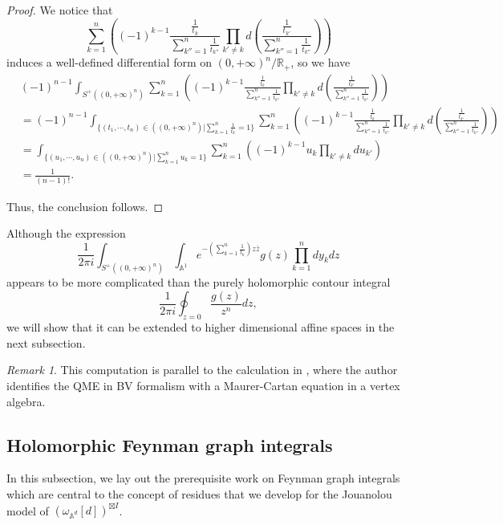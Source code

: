 \documentclass[11pt]{amsart}
\theoremstyle{definition}
\theoremstyle{remark}
\newtheorem{rem}[thm]{Remark}
\numberwithin{equation}{section}
\begin{document}
\begin{proof}
We notice that
$$
\sum_{k=1}^{n}\left((-1)^{k-1}\frac{\frac{1}{t_{k}}}{\sum_{k''=1}^{n}\frac{1}{t_{k''}}}\prod_{k'\neq k}d(\frac{\frac{1}{t_{k'}}}{\sum_{k''=1}^{n}\frac{1}{t_{k''}}})\right)
$$
induces a well-defined differential form on $(0,+\infty)^{n}/\mathbb{R}_+$, so we have
\begin{align*}
&(-1)^{n-1}\int_{S^{+}((0,+\infty)^n)}\sum_{k=1}^{n}\left((-1)^{k-1}\frac{\frac{1}{t_{k}}}{\sum_{k''=1}^{n}\frac{1}{t_{k''}}}\prod_{k'\neq k}d(\frac{\frac{1}{t_{k'}}}{\sum_{k''=1}^{n}\frac{1}{t_{k''}}})\right)\\
&=
(-1)^{n-1}\int_{\{(t_{1},\cdots,t_{n})\in((0,+\infty)^n)|\sum_{k=1}^{n}\frac{1}{t_{k}}=1\}}\sum_{k=1}^{n}\left((-1)^{k-1}\frac{\frac{1}{t_{k}}}{\sum_{k''=1}^{n}\frac{1}{t_{k''}}}\prod_{k'\neq k}d(\frac{\frac{1}{t_{k'}}}{\sum_{k''=1}^{n}\frac{1}{t_{k''}}})\right)\\
&=
\int_{\{(u_{1},\cdots,u_{n})\in((0,+\infty)^n)|\sum_{k=1}^{n}u_{k}=1\}}\sum_{k=1}^{n}\left((-1)^{k-1}u_{k}\prod_{k'\neq k}du_{k'}\right)\\
&=\frac{1}{(n-1)!}.
\end{align*}

Thus, the conclusion follows.
\end{proof}

Although the expression
$$
\frac{1}{2\pi i}\int_{S^{+}((0,+\infty)^n)}\int_{\mathbb{A}^{1}}e^{-\left(\sum_{k=1}^{n}\frac{1}{t_{k}}\right)z\bar{z}}g(z)\prod_{k=1}^{n}dy_{k}dz
$$
appears to be more complicated than the purely holomorphic contour integral
$$
\frac{1}{2\pi i}\oint_{z=0}\frac{g(z)}{z^{n}}dz,
$$
we will show that it can be extended to higher dimensional affine spaces in the next subsection.

\begin{rem}
    This computation is parallel to the calculation in \cite{li2023vertex}, where the author identifies the QME in BV formalism with a Maurer-Cartan equation in a vertex algebra.
\end{rem}

\subsection{Holomorphic Feynman graph integrals}

In this subsection, we lay out the prerequisite work on Feynman graph integrals which are central to the concept of
residues that we develop for the Jouanolou model of $(\omega_{\mathbb{A}^{d}}[d])^{\boxtimes  I}$.
\end{document}
